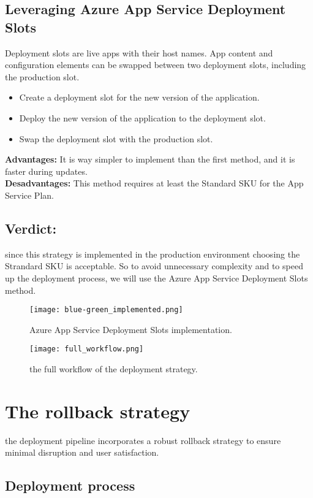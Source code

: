 \subsection*{Leveraging Azure App Service Deployment Slots}
Deployment slots are live apps with their host names. App content and configuration elements can be swapped between two deployment slots, including the production slot.
\begin{itemize}
    \item Create a deployment slot for the new version of the application.
    \item Deploy the new version of the application to the deployment slot.
    \item Swap the deployment slot with the production slot.
\end{itemize}
\textbf{Advantages:} It is way simpler to implement than the first method, and it is faster during updates.
\\
\textbf{Desadvantages:} This method requires at least the Standard SKU for the App Service Plan.
\subsection*{Verdict:}
since this strategy is implemented in the production environment choosing the Strandard SKU is acceptable. So to avoid unnecessary complexity and to speed up the deployment process, we will use the Azure App Service Deployment Slots method.
\\

\begin{figure}[htbp]
    \centering
    \texttt{[image: blue-green\_implemented.png]}
    \caption{Azure App Service Deployment Slots implementation.}
    \label{fig:deployment-slots}
\end{figure}

\begin{figure}[htbp]
    \centering
    \texttt{[image: full\_workflow.png]}
    \caption{the full workflow of the deployment strategy.}
    \label{fig:deployment-strategy-full-workflow}
\end{figure}

\pagebreak
\section{The rollback strategy}
the deployment pipeline incorporates a robust rollback strategy to ensure minimal disruption and user satisfaction.
\subsection*{Deployment process}

